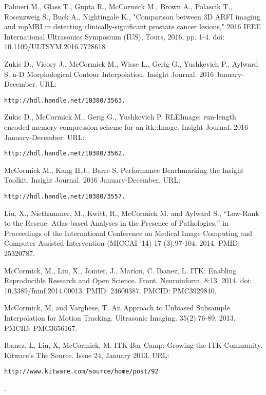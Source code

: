 \documentclass[margin,line]{res}
\begin{document}
\begin{resume}
Palmeri M., Glass T., Gupta R., McCormick M., Brown A., Polascik T.,
Rosenzweig S., Buck A., Nightingale K., "Comparison between 3D ARFI imaging
and mpMRI in detecting clinically-significant prostate cancer lesions," 2016
IEEE International Ultrasonics Symposium (IUS), Tours, 2016, pp. 1-4.  doi:
10.1109/ULTSYM.2016.7728618

Zukic D., Vicory J., McCormick M., Wisse L., Gerig G., Yushkevich P., Aylward
S. n-D Morphological Contour Interpolation. Insight Journal. 2016
January-December.
\vspace*{-.25in}
URL: \begin{verbatim}http://hdl.handle.net/10380/3563.\end{verbatim}

Zukic D., McCormick M., Gerig G., Yushkevich P. RLEImage: run-length encoded
memory compression scheme for an itk::Image. Insight Journal. 2016
January-December.
\vspace*{-.25in}
URL: \begin{verbatim}http://hdl.handle.net/10380/3562.\end{verbatim}

McCormick M., Kang H.J., Barre S. Performance Benchmarking the Insight
Toolkit. Insight Journal. 2016 January-December.
\vspace*{-.25in}
URL: \begin{verbatim}http://hdl.handle.net/10380/3557.\end{verbatim}

Liu, X., Niethammer, M., Kwitt, R., McCormick M. and Aylward S., “Low-Rank to the
Rescue: Atlas-based Analyses in the Presence of Pathologies,” in Proceedings of
the International Conference on Medical Image Computing and Computer Assisted
Intervention (MICCAI '14) 17 (3):97-104. 2014. PMID: 25320787.

McCormick, M., Liu, X., Jomier, J., Marion, C. Ibanez, L. ITK: Enabling
Reproducible Research and Open Science.  Front. Neuroinform. 8:13. 2014. doi:
10.3389/fninf.2014.00013. PMID: 24600387. PMCID: PMC3929840.

McCormick, M, and Varghese, T.  An Approach to Unbiased Subsample Interpolation
for Motion Tracking.  Ultrasonic Imaging.  35(2):76-89.  2013.  PMCID: PMC3656167.

Ibanez, L, Liu, X, McCormick, M.  ITK Bar Camp: Growing the ITK Community.  Kitware's
The Source.  Issue 24, January 2013.
\vspace*{-.25in}
URL: \begin{verbatim}http://www.kitware.com/source/home/post/92\end{verbatim}.
\vspace*{-.35in}


\end{resume}
\end{document}
